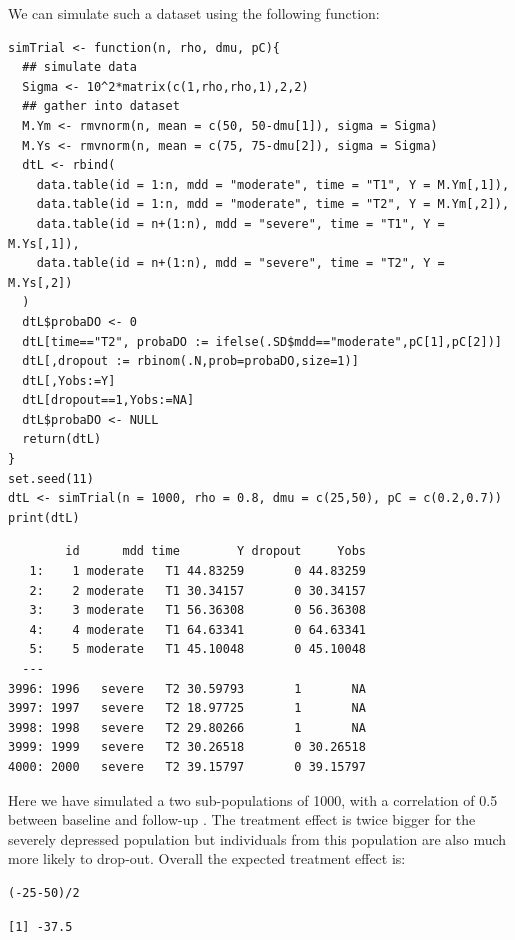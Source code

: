 \documentclass[12pt]{article}
\begin{document}
We can simulate such a dataset using the following function:
\lstset{language=r,label= ,caption= ,captionpos=b,numbers=none}
\begin{lstlisting}
simTrial <- function(n, rho, dmu, pC){
  ## simulate data
  Sigma <- 10^2*matrix(c(1,rho,rho,1),2,2)
  ## gather into dataset
  M.Ym <- rmvnorm(n, mean = c(50, 50-dmu[1]), sigma = Sigma)
  M.Ys <- rmvnorm(n, mean = c(75, 75-dmu[2]), sigma = Sigma)
  dtL <- rbind(
    data.table(id = 1:n, mdd = "moderate", time = "T1", Y = M.Ym[,1]),
    data.table(id = 1:n, mdd = "moderate", time = "T2", Y = M.Ym[,2]),
    data.table(id = n+(1:n), mdd = "severe", time = "T1", Y = M.Ys[,1]),
    data.table(id = n+(1:n), mdd = "severe", time = "T2", Y = M.Ys[,2])
  )
  dtL$probaDO <- 0
  dtL[time=="T2", probaDO := ifelse(.SD$mdd=="moderate",pC[1],pC[2])]
  dtL[,dropout := rbinom(.N,prob=probaDO,size=1)]
  dtL[,Yobs:=Y]
  dtL[dropout==1,Yobs:=NA]
  dtL$probaDO <- NULL
  return(dtL)
}
set.seed(11)
dtL <- simTrial(n = 1000, rho = 0.8, dmu = c(25,50), pC = c(0.2,0.7))
print(dtL)
\end{lstlisting}

\begin{verbatim}
        id      mdd time        Y dropout     Yobs
   1:    1 moderate   T1 44.83259       0 44.83259
   2:    2 moderate   T1 30.34157       0 30.34157
   3:    3 moderate   T1 56.36308       0 56.36308
   4:    4 moderate   T1 64.63341       0 64.63341
   5:    5 moderate   T1 45.10048       0 45.10048
  ---                                             
3996: 1996   severe   T2 30.59793       1       NA
3997: 1997   severe   T2 18.97725       1       NA
3998: 1998   severe   T2 29.80266       1       NA
3999: 1999   severe   T2 30.26518       0 30.26518
4000: 2000   severe   T2 39.15797       0 39.15797
\end{verbatim}

Here we have simulated a two sub-populations of 1000, with a
correlation of 0.5 between baseline and follow-up . The treatment
effect is twice bigger for the severely depressed population but
individuals from this population are also much more likely to
drop-out. Overall the expected treatment effect is:
\lstset{language=r,label= ,caption= ,captionpos=b,numbers=none}
\begin{lstlisting}
(-25-50)/2
\end{lstlisting}

\begin{verbatim}
[1] -37.5
\end{verbatim}
\end{document}
